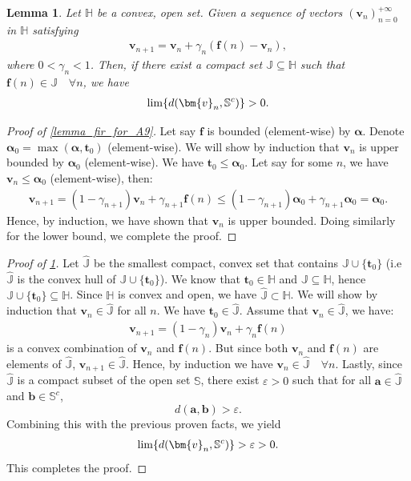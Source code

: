 \documentclass{article}
\let\inf\relax
\DeclareMathOperator*\inf{\vphantom{p}inf}
\newtheorem{lemma}{Lemma}
\def\valpha{{\bm{\alpha}}}
\def\va{{\bm{a}}}
\def\vb{{\bm{b}}}
\def\vf{{\bm{f}}}
\def\vt{{\bm{t}}}
\def\vv{{\bm{v}}}
\begin{document}
    \begin{lemma}\label{lemma_sec_for_A9}
        Let $\mathbb{H}$ be a convex, open set. Given a sequence of vectors $(\vv_n)^{+\infty}_{n=0}$ in $\mathbb{H}$ satisfying
    \begin{align*}
        \vv_{n+1}=\vv_n+\gamma_n(\vf(n)-\vv_n),
    \end{align*}
    where $0<\gamma_n<1$. Then, if there exist a compact set $\mathbb{J}\subseteq \mathbb{H}$ such that $\vf(n)\in \mathbb{J}\quad\forall n$, we have
    \begin{align*}
        \lim\inf \{d(\vv_n,\mathbb{S}^c)\}>0.
    \end{align*}
    \end{lemma}

\begin{proof}[Proof of \cref{lemma_fir_for_A9}]
    Let say $\vf$ is bounded (element-wise) by $\valpha$. Denote $\valpha_0=\max(\valpha,\vt_0)$ (element-wise). We will show by induction that $\vv_n$ is upper bounded by $\valpha_0$ (element-wise). We have $\vt_0 \leq \valpha_0$. Let say for some $n$, we have $\vv_n\leq \valpha_0$ (element-wise), then:
    \begin{align*}
        \vv_{n+1}=(1-\gamma_{n+1})\vv_n+\gamma_{n+1}\vf(n)\leq (1-\gamma_{n+1})\valpha_0+\gamma_{n+1}\valpha_0=\valpha_0.
    \end{align*}
    Hence, by induction, we have shown that $\vv_n$ is upper bounded. Doing similarly for the lower bound, we complete the proof.
\end{proof}
    
    \begin{proof}[Proof of \cref{lemma_sec_for_A9}]
        \par Let $\hat{\mathbb{J}}$ be the smallest compact, convex set that contains $\mathbb{J}\cup\{\vt_0\}$ (i.e $\hat{\mathbb{J}}$ is the convex hull of $\mathbb{J}\cup\{\vt_0\}$). We know that $\vt_0\in\mathbb{H}$ and $\mathbb{J}\subseteq\mathbb{H}$, hence $\mathbb{J}\cup\{\vt_0\}\subseteq \mathbb{H}$. Since $\mathbb{H}$ is convex and open, we have $\hat{\mathbb{J}}\subset\mathbb{H}$. We will show by induction that $\vv_n\in\hat{\mathbb{J}}$ for all $n$. We have $\vt_0\in \hat{\mathbb{J}}$. Assume that $\vv_n \in \hat{\mathbb{J}}$, we have:
        \begin{align*}
            \vv_{n+1}=(1-\gamma_{n})\vv_n+\gamma_n \vf(n)
        \end{align*}
        is a convex combination of $\vv_n$ and $\vf(n)$. But since both $\vv_n$ and $\vf(n)$ are elements of $\hat{\mathbb{J}}$,  $\vv_{n+1}\in \hat{\mathbb{J}}$. Hence, by induction we have $\vv_n\in \hat{\mathbb{J}}\quad \forall n$. Lastly, since $\hat{\mathbb{J}}$ is a compact subset of the open set $\mathbb{S}$, there exist $\varepsilon>0$ such that for all $\va\in \hat{\mathbb{J}}$ and $\vb\in \mathbb{S}^c$, $$d(\va,\vb)>\varepsilon.$$ Combining this with the previous proven facts, we yield
        \begin{align*}
            \lim\inf\{d(\vv_n,\mathbb{S}^c)\}>\varepsilon>0.
        \end{align*}
        This completes the proof.
    \end{proof}
    
\end{document}
